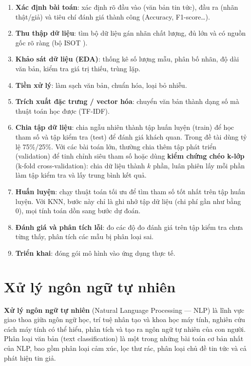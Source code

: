 \begin{enumerate}
    \item \textbf{Xác định bài toán}: xác định rõ đầu vào (văn bản tin tức), đầu ra (nhãn thật/giả) và tiêu chí đánh giá thành công (Accuracy, F1-score\ldots).
    \item \textbf{Thu thập dữ liệu}: tìm bộ dữ liệu gán nhãn chất lượng, đủ lớn và có nguồn gốc rõ ràng (bộ ISOT \cite{dataset}).
    \item \textbf{Khảo sát dữ liệu (EDA)}: thống kê số lượng mẫu, phân bố nhãn, độ dài văn bản, kiểm tra giá trị thiếu, trùng lặp.
    \item \textbf{Tiền xử lý}: làm sạch văn bản, chuẩn hóa, loại bỏ nhiễu.
    \item \textbf{Trích xuất đặc trưng / vector hóa}: chuyển văn bản thành dạng số mà thuật toán học được (TF-IDF).
    \item \textbf{Chia tập dữ liệu}: chia ngẫu nhiên thành tập huấn luyện (train) để học tham số và tập kiểm tra (test) để đánh giá khách quan. Trong đề tài dùng tỷ lệ 75\%/25\%. Với các bài toán lớn, thường chia thêm tập phát triển (validation) để tinh chỉnh siêu tham số hoặc dùng \textbf{kiểm chứng chéo k-lớp} (k-fold cross-validation): chia dữ liệu thành $k$ phần, luân phiên lấy mỗi phần làm tập kiểm tra và lấy trung bình kết quả.
    \item \textbf{Huấn luyện}: chạy thuật toán tối ưu để tìm tham số tốt nhất trên tập huấn luyện. Với KNN, bước này chỉ là ghi nhớ tập dữ liệu (chi phí gần như bằng 0), mọi tính toán dồn sang bước dự đoán.
    \item \textbf{Đánh giá và phân tích lỗi}: đo các độ đo đánh giá trên tập kiểm tra chưa từng thấy, phân tích các mẫu bị phân loại sai.
    \item \textbf{Triển khai}: đóng gói mô hình vào ứng dụng thực tế.
\end{enumerate}

\section{Xử lý ngôn ngữ tự nhiên}

\textbf{Xử lý ngôn ngữ tự nhiên} (Natural Language Processing --- NLP) là lĩnh vực giao thoa giữa ngôn ngữ học, trí tuệ nhân tạo và khoa học máy tính, nghiên cứu cách máy tính có thể hiểu, phân tích và tạo ra ngôn ngữ tự nhiên của con người. Phân loại văn bản (text classification) là một trong những bài toán cơ bản nhất của NLP, bao gồm phân loại cảm xúc, lọc thư rác, phân loại chủ đề tin tức và cả phát hiện tin giả.

